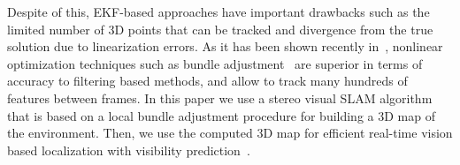 Despite of this, EKF-based approaches have important drawbacks such as
the limited number of 3D points that can be tracked and divergence
from the true solution due to linearization errors. As it has been
shown recently in~\cite{Strasdat10icra}, nonlinear optimization
techniques such as bundle adjustment~\cite{Mouragnon09ivc} are
superior in terms of accuracy to filtering based methods, and allow to
track many hundreds of features between frames. In this paper we use a
stereo visual SLAM algorithm that is based on a local bundle
adjustment procedure for building a 3D map of the environment. Then,
we use the computed 3D map for efficient real-time vision based
localization with visibility
prediction~\cite{Alcantarilla10icra,Alcantarilla11icra}.

